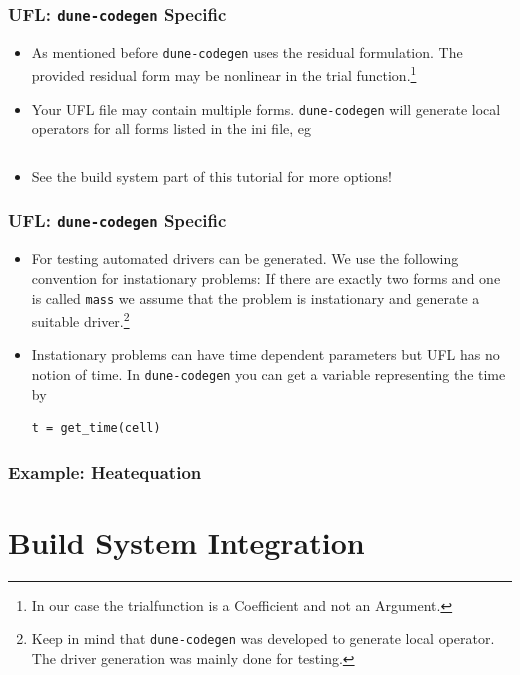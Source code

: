 \documentclass[ignorenonframetext,11pt]{beamer}
\theoremstyle{definition}
\begin{document}
\begin{frame}[fragile]
  \frametitle{UFL: \lstinline{dune-codegen} Specific}
  \begin{itemize}
  \item As mentioned before \lstinline{dune-codegen} uses the residual
    formulation. The provided residual form may be nonlinear in the trial
    function.\footnote{In our case the trialfunction is a Coefficient and not
      an Argument.}
  \item Your UFL file may contain multiple forms. \lstinline{dune-codegen} will
    generate local operators for all forms listed in the ini file, eg
    \inputminted[fontsize=\small, firstline=12, lastline=13]{ini}{../src/heatequation.ini}
  \item See the build system part of this tutorial for more options!
  \end{itemize}
\end{frame}

\begin{frame}[fragile]
  \frametitle{UFL: \lstinline{dune-codegen} Specific}
  \begin{itemize}
  \item For testing automated drivers can be generated. We use the following
    convention for instationary problems: If there are exactly two forms and
    one is called \lstinline{mass} we assume that the problem is instationary
    and generate a suitable driver.\footnote{Keep in mind that
      \lstinline{dune-codegen} was developed to generate local operator. The
      driver generation was mainly done for testing.}
  \item Instationary problems can have time dependent parameters but UFL has no
    notion of time. In \lstinline{dune-codegen} you can get a variable
    representing the time by
    \begin{lstlisting}[basicstyle=\scriptsize, backgroundcolor=\color{listingbg}]
t = get_time(cell)
    \end{lstlisting}
    \end{itemize}
\end{frame}

\begin{frame}
  \frametitle{Example: Heatequation}
  
\end{frame}


\section{Build System Integration}
\end{document}
